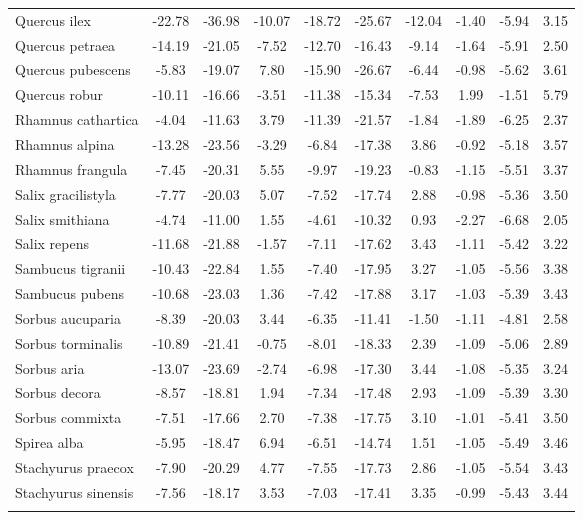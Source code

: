 \documentclass[11pt]{article}
\begin{document}
\begin{longtable}{p{1.50in}c{0.32in}c{0.32in}c{0.32in}c{0.32in}c{0.32in}c{0.32in}c{0.2in}c{0.3in}c{0.1in}}
  Quercus ilex & -22.78 & -36.98 & -10.07 & -18.72 & -25.67 & -12.04 & -1.40 & -5.94 & 3.15 \\ 
  Quercus petraea & -14.19 & -21.05 & -7.52 & -12.70 & -16.43 & -9.14 & -1.64 & -5.91 & 2.50 \\ 
  Quercus pubescens & -5.83 & -19.07 & 7.80 & -15.90 & -26.67 & -6.44 & -0.98 & -5.62 & 3.61 \\ 
  Quercus robur & -10.11 & -16.66 & -3.51 & -11.38 & -15.34 & -7.53 & 1.99 & -1.51 & 5.79 \\ 
  Rhamnus cathartica & -4.04 & -11.63 & 3.79 & -11.39 & -21.57 & -1.84 & -1.89 & -6.25 & 2.37 \\ 
  Rhamnus alpina & -13.28 & -23.56 & -3.29 & -6.84 & -17.38 & 3.86 & -0.92 & -5.18 & 3.57 \\ 
  Rhamnus frangula & -7.45 & -20.31 & 5.55 & -9.97 & -19.23 & -0.83 & -1.15 & -5.51 & 3.37 \\ 
  Salix gracilistyla & -7.77 & -20.03 & 5.07 & -7.52 & -17.74 & 2.88 & -0.98 & -5.36 & 3.50 \\ 
  Salix smithiana & -4.74 & -11.00 & 1.55 & -4.61 & -10.32 & 0.93 & -2.27 & -6.68 & 2.05 \\ 
  Salix repens & -11.68 & -21.88 & -1.57 & -7.11 & -17.62 & 3.43 & -1.11 & -5.42 & 3.22 \\ 
  Sambucus tigranii & -10.43 & -22.84 & 1.55 & -7.40 & -17.95 & 3.27 & -1.05 & -5.56 & 3.38 \\ 
  Sambucus pubens & -10.68 & -23.03 & 1.36 & -7.42 & -17.88 & 3.17 & -1.03 & -5.39 & 3.43 \\ 
  Sorbus aucuparia & -8.39 & -20.03 & 3.44 & -6.35 & -11.41 & -1.50 & -1.11 & -4.81 & 2.58 \\ 
  Sorbus torminalis & -10.89 & -21.41 & -0.75 & -8.01 & -18.33 & 2.39 & -1.09 & -5.06 & 2.89 \\ 
  Sorbus aria & -13.07 & -23.69 & -2.74 & -6.98 & -17.30 & 3.44 & -1.08 & -5.35 & 3.24 \\ 
  Sorbus decora & -8.57 & -18.81 & 1.94 & -7.34 & -17.48 & 2.93 & -1.09 & -5.39 & 3.30 \\ 
  Sorbus commixta & -7.51 & -17.66 & 2.70 & -7.38 & -17.75 & 3.10 & -1.01 & -5.41 & 3.50 \\ 
  Spirea alba & -5.95 & -18.47 & 6.94 & -6.51 & -14.74 & 1.51 & -1.05 & -5.49 & 3.46 \\ 
  Stachyurus praecox & -7.90 & -20.29 & 4.77 & -7.55 & -17.73 & 2.86 & -1.05 & -5.54 & 3.43 \\ 
  Stachyurus sinensis & -7.56 & -18.17 & 3.53 & -7.03 & -17.41 & 3.35 & -0.99 & -5.43 & 3.44 \\ 
  \hline
\label{tab:tablesupp2}
\end{longtable}
\endgroup \clearpage \pagebreak 
\end{document}
